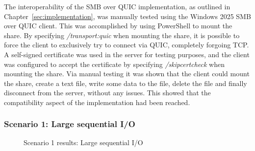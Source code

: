 \documentclass[english, 12pt, a4paper, elec, utf8, a-2b, online]{aaltothesis}
\begin{document}
The interoperability of the SMB over QUIC implementation, as outlined in Chapter~\ref{sec:implementation},
was manually tested using the Windows 2025 SMB over QUIC client. This was accomplished
by using PowerShell to mount the share. By specifying \textit{/transport:quic} when
mounting the share, it is possible to force the client to exclusively try to connect
via QUIC, completely forgoing TCP. A self-signed certificate was used in the server
for testing purposes, and the client was configured to accept the certificate by
specifying \textit{/skipcertcheck} when mounting the share. Via manual testing it
was shown that the client could mount the share, create a text file, write some
data to the file, delete the file and finally disconnect from the server, without
any issues. This showed that the compatibility aspect of the implementation had been
reached.

\subsubsection{Scenario 1: Large sequential I/O}
\begin{figure}[h]
\centering
{}

\caption{Scenario 1 results: Large sequential I/O}
\label{fig:scenario_1}
\end{figure}
\end{document}
